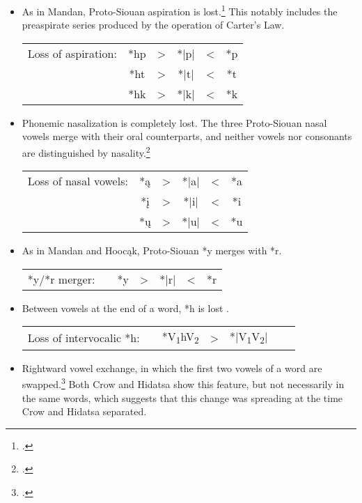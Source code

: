 \documentclass[output=paper]{LSP/langsci}
\begin{document}
\begin{itemize}
\item As in Mandan, Proto-Siouan aspiration is lost.\footnote{\citealt[50, 85]{Rankinetal2006PDF}.} This notably includes the preaspirate series produced by the operation of Carter's Law.

				
\begin{tabular}[t]{c c c c c c }
Loss of aspiration: & *hp & > & *|p|	& < & 	*p \\
& *ht	 & > & *|t|	& <	 & *t \\
& *hk & > & *|k|	 & < & *k \\
\end{tabular}

\item Phonemic nasalization is completely lost.  The three Proto-Siouan nasal vowels merge with their oral counterparts, and neither vowels nor consonants are distinguished by nasality.\footnote{\citealt[109]{Rankinetal2006PDF}.}


\begin{tabular}[t]{c c c c c c }
Loss of nasal vowels: &	*\k{a} & >	& *|a| & < & *a \\
& *\k{i} & > & *|i| & < & *i \\
& *\k{u} & > & *|u| & < & *u \\
\end{tabular}

\item As in Mandan and Hooc\k{a}k, Proto-Siouan *y merges with *r.



\begin{tabular}[t]{c c c c c c c}
*y/*r merger: & & *y	 & >  & *|r| &  <	 & *r 
\end{tabular}

\item Between vowels at the end of a word, *h is lost .



\begin{tabular}[t]{c c c c c c c}
Loss of intervocalic *h: & & *V\textsubscript{1}hV\textsubscript{2} & > & *|V\textsubscript{1}V\textsubscript{2}|	
\end{tabular}

\item Rightward vowel exchange, in which the first two vowels of a word are swapped.\footnote{\citealt[193, 788]{Rankinetal2006PDF}.}  Both Crow and Hidatsa show this feature, but not necessarily in the same words, which suggests that this change was spreading at the time Crow and Hidatsa separated.


\end{itemize}
\end{document}
